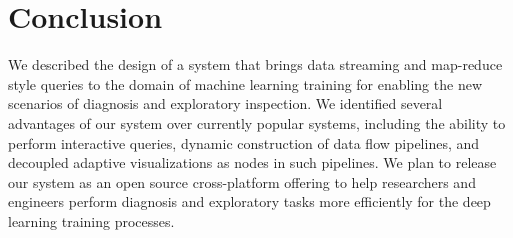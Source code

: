 \documentclass[sigchi]{acmart} %
\begin{document}




\section{Conclusion}
We described the design of a system that brings data streaming and map-reduce style queries to the domain of machine learning training for enabling the new scenarios of diagnosis and exploratory inspection. We identified several advantages of our system over currently popular systems, including the ability to perform interactive queries, dynamic construction of data flow pipelines, and decoupled adaptive visualizations as nodes in such pipelines. We plan to release our system as an open source cross-platform offering to help researchers and engineers perform diagnosis and exploratory tasks more efficiently for the deep learning training processes.
\end{document}
